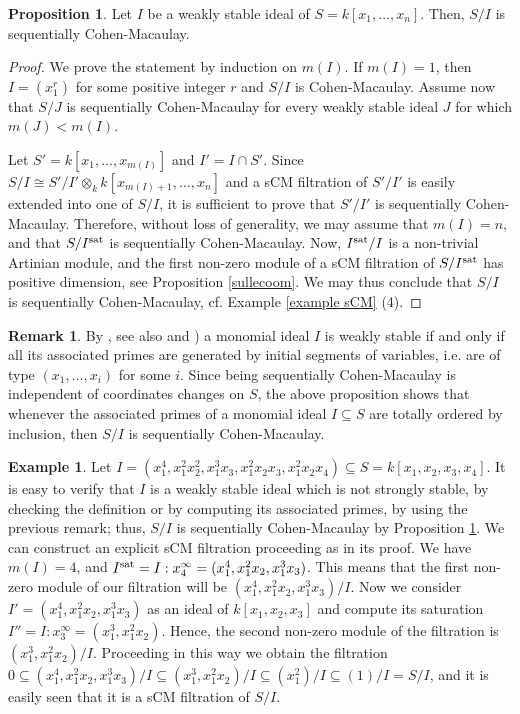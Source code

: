 \documentclass[12pt]{amsart}
\theoremstyle{definition}
\newtheorem{proposition}[theorem]{Proposition}
\theoremstyle{definition}
\newtheorem{remark}[theorem]{Remark}
\newtheorem{example}[theorem]{Example}
\begin{document}
\begin{proposition}\label{wsscm}
Let $I$ be a weakly stable ideal of  $S=k[x_1, \dots, x_n]$. Then, $S/I$ is sequentially Cohen-Macaulay. 
\end{proposition}

\begin{proof}
    We prove the statement by induction on $m(I)$. If $m(I)=1$, then $I=(x_1^{r})$ for some positive integer $r$ and $S/I$ is Cohen-Macaulay. Assume now that $S/J$ is sequentially Cohen-Macaulay for every weakly stable ideal $J$ for which $m(J)<m(I)$.

    Let $S'=k[x_1, \dots, x_{m(I)}]$  and  $I'=I\cap S'$. Since $S/I \cong  S'/I' \otimes_{k}k[x_{m(I)+1},\dots, x_n]$ and a sCM filtration of $S'/I'$ is easily extended into one of $S/I$, it is sufficient to prove that $S'/I'$ is sequentially Cohen-Macaulay. Therefore, without loss of generality,  we may assume that $m(I)=n$, and that   $S/I^{\rm sat}$ is sequentially Cohen-Macaulay. Now,  $I^{\rm sat}/I$ is a non-trivial Artinian module, and the first non-zero module of a sCM filtration of $S/I^{\rm sat}$ has positive dimension, see Proposition \ref{sullecoom}. We may thus conclude that $S/I$ is sequentially Cohen-Macaulay, cf. Example \ref{example sCM} (4).
\end{proof}

\begin{remark}\label{bravog}  By \cite[Proposition 3.2]{BG06}, see also \cite[Proposition 4.2.9]{HH11} and \cite[Chapter 4]{C04}) a monomial ideal $I$ is weakly stable if and only if all its associated primes are generated by initial segments of variables, i.e. are of type $(x_1,\ldots,x_i)$ for some $i$. Since being sequentially Cohen-Macaulay is independent of coordinates changes on $S$, the above proposition shows that whenever the associated primes of a monomial ideal $I\subseteq S$ are totally ordered by inclusion, then $S/I$ is sequentially Cohen-Macaulay.
\end{remark}

\begin{example}
  Let $I=(x_1^4,x_1^2 x_2^2,x_1^3 x_3,x_1^2 x_2 x_3,x_1^2 x_2 x_4)\subseteq S=k[x_1,x_2,x_3,x_4]$. It is easy to verify that $I$ is a weakly stable ideal which is not strongly stable, by checking the definition or by computing its associated primes, by using the previous remark; thus, $S/I$ is sequentially Cohen-Macaulay by Proposition \ref{wsscm}.  We can construct an explicit sCM filtration proceeding as in its proof.  We have $m(I)=4$, and  $I^{\rm sat}=I:x_4^{\infty}=(x_1^4,x_1^2 x_2,x_1^3 x_3)$. This means that the first non-zero module of our filtration will be $(x_1^4,x_1^2 x_2,x_1^3 x_3)/I$. Now we consider  $I'=(x_1^4,x_1^2 x_2,x_1^3 x_3)$ as an ideal of $k[x_1,x_2,x_3]$ and compute  its saturation  $I''=I:x_3^{\infty}=(x_1^3,x_1^2 x_2)$.
    Hence, the second non-zero module of the filtration is $(x_1^3,x_1^2 x_2)/I$. Proceeding  in this way we obtain the filtration $    0 \subseteq (x_1^4,x_1^2 x_2,x_1^3 x_3)/I \subseteq (x_1^3,x_1^2 x_2)/I \subseteq (x_1^2)/I \subseteq (1)/I=S/I$, and it is easily seen that it is a sCM filtration of $S/I$.

\end{example}
\end{document}
